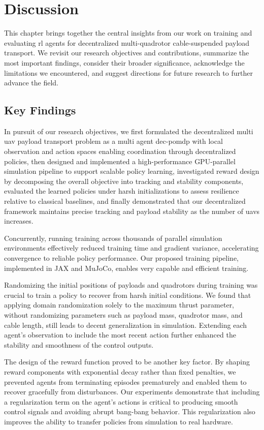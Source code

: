 \chapter{Discussion}
This chapter brings together the central insights from our work on training and evaluating \gls{rl} agents for decentralized multi-quadrotor cable-suspended payload transport. We revisit our research objectives and contributions, summarize the most important findings, consider their broader significance, acknowledge the limitations we encountered, and suggest directions for future research to further advance the field.

\section{Key Findings}
In pursuit of our research objectives, we first formulated the decentralized multi \gls{uav} payload transport problem as a multi agent \gls{dec-pomdp} with local observation and action spaces enabling coordination through decentralized policies, then designed and implemented a high-performance GPU-parallel simulation pipeline to support scalable policy learning, investigated reward design by decomposing the overall objective into tracking and stability components, evaluated the learned policies under harsh initializations to assess resilience relative to classical baselines, and finally demonstrated that our decentralized framework maintains precise tracking and payload stability as the number of \glspl{uav} increases.

Concurrently, running training across thousands of parallel simulation environments effectively reduced training time and gradient variance, accelerating convergence to reliable policy performance. Our proposed training pipeline, implemented in JAX and MuJoCo, enables very capable and efficient training.

Randomizing the initial positions of payloads and quadrotors during training was crucial to train a policy to recover from harsh initial conditions. We found that applying domain randomization solely to the maximum thrust parameter, without randomizing parameters such as payload mass, quadrotor mass, and cable length, still leads to decent generalization in simulation. Extending each agent's observation to include the most recent action further enhanced the stability and smoothness of the control outputs.

The design of the reward function proved to be another key factor. By shaping reward components with exponential decay rather than fixed penalties, we prevented agents from terminating episodes prematurely and enabled them to recover gracefully from disturbances. Our experiments demonstrate that including a regularization term on the agent's actions is critical to producing smooth control signals and avoiding abrupt bang-bang behavior. This regularization also improves the ability to transfer policies from simulation to real hardware. 

